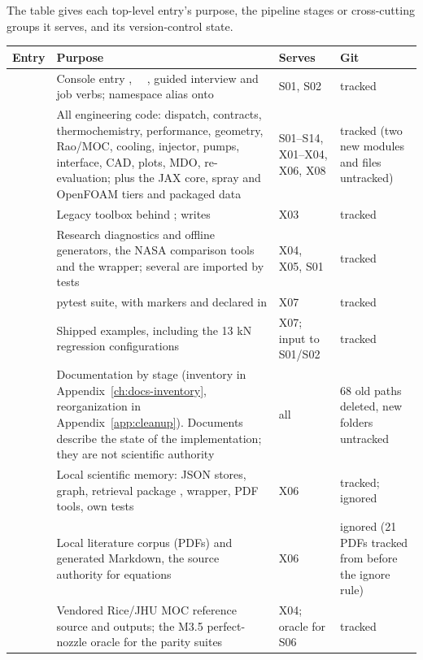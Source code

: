 The table gives each top-level entry's purpose, the pipeline stages or cross-cutting groups it serves, and its version-control state.

{\small
\begin{longtable}{P{3.4cm}P{6.8cm}P{2.5cm}P{2.6cm}}
\toprule
Entry & Purpose & Serves & Git \\
\midrule
\endhead
{} & Console entry , ~~, guided interview and job verbs; namespace alias onto  & S01, S02 & tracked \\
 & All engineering code: dispatch, contracts, thermochemistry, performance, geometry, Rao/MOC, cooling, injector, pumps, interface, CAD, plots, MDO, re-evaluation; plus the JAX core, spray and OpenFOAM tiers and packaged data & S01--S14, X01--X04, X06, X08 & tracked (two new modules and  files untracked) \\
 & Legacy toolbox behind ; writes  & X03 & tracked \\
 & Research diagnostics and offline generators, the NASA comparison tools and the  wrapper; several are imported by tests & X04, X05, S01 & tracked \\
 & pytest suite, with markers  and  declared in  & X07 & tracked \\
 & Shipped  examples, including the 13 kN regression configurations & X07; input to S01/S02 & tracked \\
 & Documentation by stage (inventory in Appendix~\ref{ch:docs-inventory}, reorganization in Appendix~\ref{app:cleanup}). Documents describe the state of the implementation; they are not scientific authority & all & 68 old paths deleted, new folders untracked \\
 & Local scientific memory: JSON stores, graph, retrieval package ,  wrapper, PDF tools, own tests & X06 & tracked;  ignored \\
 & Local literature corpus (PDFs) and generated Markdown, the source authority for equations & X06 & ignored (21 PDFs tracked from before the ignore rule) \\
 & Vendored Rice/JHU MOC reference source and outputs; the M3.5 perfect-nozzle oracle for the parity suites & X04; oracle for S06 & tracked \\

\end{longtable}}
